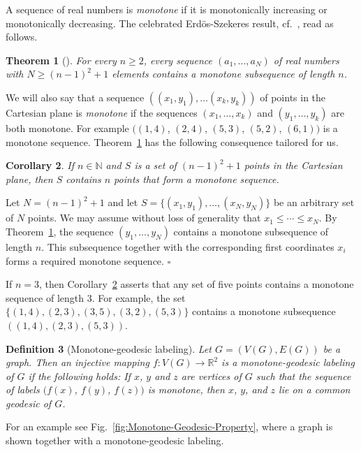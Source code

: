 \documentclass[12pt]{article}
\newtheorem{theorem}{Theorem}[section]
\newtheorem{corollary}[theorem]{Corollary}
\newtheorem{definition}[theorem]{Definition}
\newcommand{\proof}{\noindent{\bf Proof.\ }}
\newcommand{\qed}{\hfill $\square$\medskip}
\begin{document}
A sequence of real numbers is {\it monotone} if it is monotonically increasing or monotonically decreasing. The celebrated Erd\"os-Szekeres result, cf.~\cite[Theorem 1.1]{bukh-2014}, read as follows.  

\begin{theorem}[\cite{ErSz35}]
\label{thm:Er-Sze}
For every $n\ge 2$, every sequence $(a_1,\ldots, a_N)$ of real numbers with $N\ge (n-1)^2 + 1$ elements contains a monotone subsequence of length $n$. 
\end{theorem}

We will also say that a sequence $((x_1, y_1), \ldots (x_k, y_k))$ of points in the Cartesian plane is {\em monotone} if the sequences $(x_1, \ldots, x_k)$ and $(y_1, \ldots, y_k)$ are both monotone. For example $((1,4)$, $(2,4)$, $(5,3)$, $(5,2)$, $(6,1))$ is a monotone sequence. Theorem~\ref{thm:Er-Sze} has the following consequence tailored for us. 

\begin{corollary}
\label{cor:5-points}
If $n\in {\mathbb N}$ and $S$ is a set of $(n - 1)^2 + 1$ points in the Cartesian plane, then $S$ contains $n$ points that form a monotone sequence.   
\end{corollary}

\proof
Let $N = (n - 1)^2 + 1$ and let $S = \{(x_1,y_1),\ldots, (x_N,y_N)\}$ be an arbitrary set of $N$ points. We may assume without loss of generality that $x_1\le \cdots \le x_N$. By Theorem~\ref{thm:Er-Sze}, the sequence $(y_1, \ldots, y_N)$ contains a monotone subsequence of length $n$. This subsequence together with the corresponding first coordinates $x_i$ forms a required monotone sequence. 
\qed

If $n=3$, then Corollary~\ref{cor:5-points} asserts that any set of five points contains a monotone sequence of length $3$. For example, the set $\{(1,4), (2,3), (3,5), (3,2), (5,3)\}$ contains a monotone subsequence $((1,4), (2,3), (5,3))$. 

\begin{definition}[Monotone-geodesic labeling]
\label{Mon-Geo-Pro}
Let $G = (V(G),E(G))$ be a graph. Then an injective mapping $f:V(G)\rightarrow {\mathbb R}^2$ is a {\em monotone-geodesic labeling} of $G$ if the following holds: If $x$, $y$ and $z$ are vertices of $G$ such that the sequence of labels $(f(x)$, $f(y)$, $f(z))$ is monotone, then $x$, $y$, and $z$ lie on a common geodesic of $G$.  
\end{definition}

For an example see Fig.~\ref{fig:Monotone-Geodesic-Property}, where a graph is shown together with a monotone-geodesic labeling. 
\end{document}
